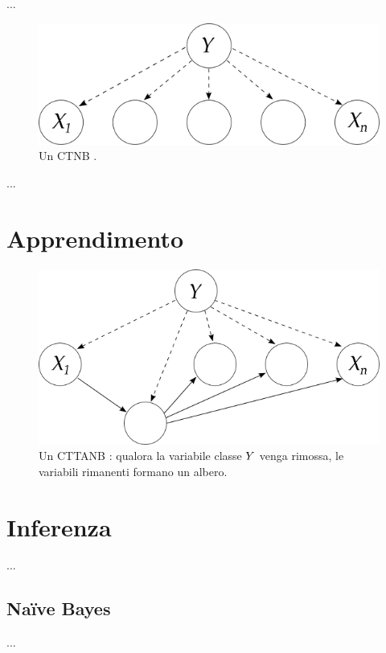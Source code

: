 \begin{definizione}\label{defn:ctnbc}
...
\end{definizione}

\begin{figure}
\centering
\includegraphics[width=0.9\columnwidth]{immagini/ctnb}
\caption[Un \acs{CTNB} \class{}]{Un \acl{CTNB} \class{}.}
\label{fig:ctnb}
\end{figure}

\begin{definizione}\label{defn:cttanbc}
...
\end{definizione}

\section{Apprendimento}\label{sec:learning-ctbnc}

\begin{figure}
\centering
\includegraphics[width=0.9\columnwidth]{immagini/cttanb}
\caption[Un \acs{CTTANB} \class{}]{Un \acl{CTTANB} \class{}: qualora la variabile classe $\mathnormal{Y}$ venga rimossa, le variabili rimanenti formano un albero.}
\label{fig:cttanb}
\end{figure}

\section{Inferenza}\label{sec:inference-ctbnc}
...

\subsection{Na\"ive Bayes}\label{sec:inference-ctnb}
...

